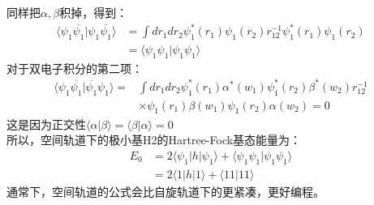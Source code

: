 \documentclass[12pt, a4paper, oneside]{ctexart}
\begin{document}
同样把$\alpha,\beta$积掉，得到：
\begin{equation}
\begin{aligned}
\langle \psi_1\overline{\psi_1}|\psi_1\overline{\psi_1}\rangle&=\int dr_1dr_2\psi_1^*(r_1)\psi_1(r_2) r_{12}^{-1}\psi_1^*(r_1)\psi_1(r_2)\\
&=\langle \psi_1\psi_1|\psi_1\psi_1\rangle
\end{aligned}
\end{equation}
对于双电子积分的第二项：
\begin{equation}
\begin{aligned}
\langle \psi_1\overline{\psi_1}|\overline{\psi_1}\psi_1\rangle=&\int dr_1dr_2\psi_1^*(r_1)\alpha^*(w_1)\psi_1^*(r_2)\beta^*(w_2) r_{12}^{-1}\\
&\times\psi_1(r_1)\beta(w_1)\psi_1(r_2)\alpha(w_2)=0
\end{aligned}
\end{equation}
这是因为正交性$\langle \alpha|\beta\rangle=\langle \beta|\alpha\rangle=0$\\
所以，空间轨道下的极小基H2的Hartree-Fock基态能量为：
\begin{equation}
\begin{aligned}
E_0&=2\langle\psi_1|h|\psi_1\rangle+\langle\psi_1\psi_1|\psi_1\psi_1\rangle\\
   &=2\langle1|h|1\rangle+\langle 11|11\rangle
\end{aligned}
\end{equation}
通常下，空间轨道的公式会比自旋轨道下的更紧凑，更好编程。
\end{document}
